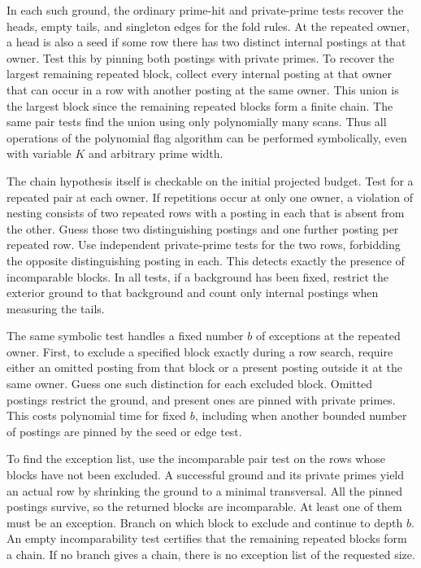 In each such ground, the ordinary prime-hit and
private-prime tests recover the heads, empty tails,
and singleton edges for the fold rules. At the
repeated owner, a head is also a seed if some row
there has two distinct internal postings at that
owner. Test this by pinning both postings with
private primes. To recover the largest remaining
repeated block, collect every internal posting at
that owner that can occur in a row with another
posting at the same owner. This union is the largest
block since the remaining repeated blocks form a
finite chain. The same pair tests find the union
using only polynomially many scans. Thus all
operations of the polynomial flag algorithm can
be performed symbolically, even with variable
$K$ and arbitrary prime width.

The chain hypothesis itself is checkable on the
initial projected budget. Test for a repeated
pair at each owner. If repetitions occur at only
one owner, a violation of nesting consists of two
repeated rows with a posting in each that is absent
from the other. Guess those two distinguishing
postings and one further posting per repeated
row. Use independent private-prime tests for the
two rows, forbidding the opposite distinguishing
posting in each. This detects exactly the presence
of incomparable blocks. In all tests, if a
background has been fixed, restrict the exterior
ground to that background and count only internal
postings when measuring the tails.

The same symbolic test handles a fixed number $b$
of exceptions at the repeated owner. First, to
exclude a specified block exactly during a row
search, require either an omitted posting from
that block or a present posting outside it at the
same owner. Guess one such distinction for each
excluded block. Omitted postings restrict the
ground, and present ones are pinned with private
primes. This costs polynomial time for fixed $b$,
including when another bounded number of postings
are pinned by the seed or edge test.

To find the exception list, use the incomparable
pair test on the rows whose blocks have not been
excluded. A successful ground and its private
primes yield an actual row by shrinking the
ground to a minimal transversal. All the pinned
postings survive, so the returned blocks are
incomparable. At least one of them must be an
exception. Branch on which block to exclude and
continue to depth $b$. An empty incomparability
test certifies that the remaining repeated
blocks form a chain. If no branch gives a chain,
there is no exception list of the requested size.

